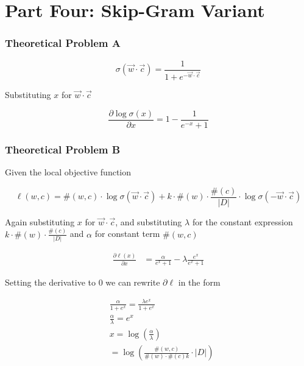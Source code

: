\chapter*{Part Four: Skip-Gram Variant}




\subsection*{Theoretical Problem A}
\begin{equation*}
    \sigma(\vec{w} \cdot \vec{c})=\frac{1}{1+e^{-\vec{w} \cdot \vec{c}}}
\end{equation*}

Substituting $x$ for $\vec{w} \cdot \vec{c}$

\begin{equation*}
    \frac{\partial \log \sigma(x)}{\partial x} = 1 - \frac{1}{e^{-x}+1}
\end{equation*}

\subsection*{Theoretical Problem B}

Given the local objective function

\begin{equation*}
    \ell(w, c)=\#(w, c) \cdot \log \sigma(\vec{w} \cdot \vec{c})+k \cdot \#(w) \cdot \frac{\#(c)}{|D|} \cdot \log \sigma(-\vec{w} \cdot \vec{c})
\end{equation*}

Again substituting $x$ for $\vec{w} \cdot \vec{c}$, and substituting $\lambda$ for the constant expression $k \cdot \#(w) \cdot \frac{\#(c)}{|D|}$ and $\alpha$ for constant term $\#(w,c)$

\begin{align*}
    \frac{\partial \ell(x)}{\partial x} & = \frac{\alpha}{e^x + 1} -\lambda \frac{e^x}{e^x + 1}
\end{align*}

Setting the derivative to $0$ we can rewrite $\partial \ell$ in the form

\begin{align*}
     & \frac{\alpha}{1 + e^x} = \frac{\lambda e^x}{1 + e^x}             \\
     & \frac{\alpha}{\lambda} = e^x                                     \\
     & x = \log(\frac{\alpha}{\lambda})                                 \\
     & =\log \left(\frac{\#(w, c)}{\#(w) \cdot \#(c) k} \cdot|D|\right)
\end{align*}

